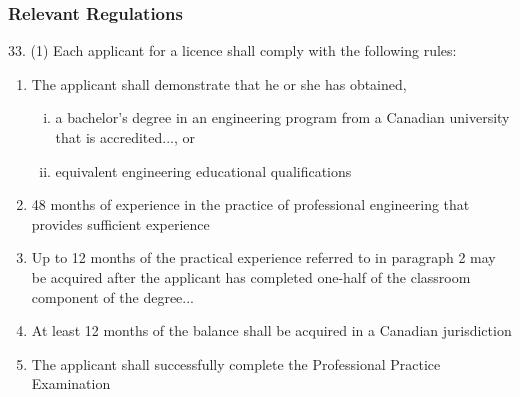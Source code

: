 \begin{frame}
\frametitle{Relevant Regulations}

33. (1) Each applicant for a licence shall comply with the following rules:
\begin{enumerate}
\item The applicant shall demonstrate that he or she has obtained,
	\begin{enumerate}[i)]
	\item a bachelor's degree in an engineering program from a
		Canadian university that is accredited..., or
	\item equivalent engineering educational qualifications 
	\end{enumerate}
\item 48 months of experience in the practice of professional engineering that provides sufficient experience
\item Up to 12 months of the practical experience referred to in paragraph 2 may be acquired after the applicant has completed one-half of the classroom component of the degree...
\item At least 12 months of the balance shall be acquired in a Canadian jurisdiction
\item The applicant shall successfully complete the Professional
Practice Examination
\end{enumerate}

\end{frame}



